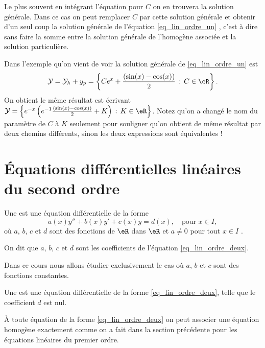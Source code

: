 \begin{remark}
  Le plus souvent en intégrant l'équation pour $C$ on en trouvera la solution générale. Dans ce cas on peut remplacer $C$ par cette solution générale et obtenir d'un seul coup la solution générale de l'équation \eqref{eq_lin_ordre_un} , c'est à dire sans faire la somme entre la solution générale de l'homogène associée et la solution particulière.

  \begin{example}
    Dans l'exemple qu'on vient de voir la solution générale de \eqref{eq_lin_ordre_un} est
    \begin{equation}
      \mathcal{Y} = \mathcal{Y}_h + y_p = \left\{Ce^x + \frac{(\sin(x)-\cos(x))}{2} \,:\, C\in\eR\right\}.
    \end{equation}
On obtient le m\^eme résultat est écrivant $\mathcal{Y} = \left\{e^{-x}\left(e^{-1}\frac{(\sin(x)-\cos(x))}{2} +K \right) \,:\, K\in\eR\right\}$. Notez qu'on a changé le nom du paramètre de $C$ à $K$ seulement pour souligner qu'on obtient de m\^eme résultat par deux chemins différents, sinon les deux expressions sont équivalentes !
  \end{example}
\end{remark}

\section{Équations différentielles linéaires du second ordre}
\label{Secordredeux}

\begin{definition}
Une   est une équation différentielle de la forme
\begin{equation}\label{eq_lin_ordre_deux}
  a(x)y'' + b(x) y' + c(x)y = d(x), \quad\text{pour } x\in I,
\end{equation}
o\`u $a$, $b$, $c$ et $d$ sont des fonctions de $\eR$ dans $\eR$ et $a\neq 0$ pour tout $x\in I$ .

On dit que $a$, $b$, $c$ et $d$ sont les coefficients de l'équation \eqref{eq_lin_ordre_deux}.
\end{definition}
Dans ce cours nous allons étudier exclusivement le cas où $a$, $b$ et $c$ sont des fonctions constantes.
\begin{definition}
Une   est une équation différentielle de la forme \eqref{eq_lin_ordre_deux}, telle que le coefficient $d$ est nul.
\end{definition}
À toute équation de la forme \eqref{eq_lin_ordre_deux} on peut associer une équation homogène exactement comme on a fait dans la section précédente pour les équations linéaires du premier ordre.
